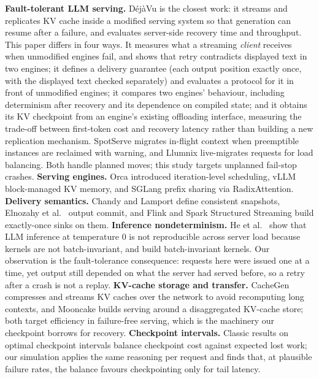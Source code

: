 \documentclass[10pt,twocolumn]{article}
\begin{document}
\textbf{Fault-tolerant LLM serving.} D\'ej\`aVu \cite{strati2024dejavu}
is the closest work: it streams and replicates KV cache inside a modified
serving system so that generation can resume after a failure, and evaluates
server-side recovery time and throughput. This paper differs in four ways.
It measures what a streaming \emph{client} receives when unmodified engines
fail, and shows that retry contradicts displayed text in two engines; it
defines a delivery guarantee (each output position exactly once, with the
displayed text checked separately) and evaluates a protocol for it in front
of unmodified engines; it compares two engines' behaviour, including
determinism after recovery and its dependence on compiled state; and it
obtains its KV checkpoint from an engine's existing offloading interface,
measuring the trade-off between first-token cost and recovery latency
rather than building a new replication mechanism. SpotServe \cite{miao2024spotserve} migrates in-flight context when
preemptible instances are reclaimed with warning, and Llumnix
\cite{sun2024llumnix} live-migrates requests for load balancing. Both handle
planned moves; this study targets unplanned fail-stop crashes.
\textbf{Serving engines.} Orca \cite{yu2022orca} introduced iteration-level
scheduling, vLLM \cite{kwon2023pagedattention} block-managed KV memory, and
SGLang \cite{zheng2024sglang} prefix sharing via RadixAttention.
\textbf{Delivery semantics.} Chandy and Lamport \cite{chandy1985snapshots}
define consistent snapshots, Elnozahy et al.\ \cite{elnozahy2002survey}
output commit, and Flink \cite{carbone2015lightweight} and Spark Structured
Streaming \cite{armbrust2018structured} build exactly-once sinks on them.
\textbf{Inference nondeterminism.} He et al.\ \cite{he2025nondeterminism}
show that LLM inference at temperature 0 is not reproducible across server
load because kernels are not batch-invariant, and build batch-invariant
kernels. Our observation is the fault-tolerance consequence: requests here
were issued one at a time, yet output still depended on what the server had
served before, so a retry after a crash is not a replay.
\textbf{KV-cache storage and transfer.} CacheGen \cite{liu2024cachegen}
compresses and streams KV caches over the network to avoid recomputing long
contexts, and Mooncake \cite{qin2025mooncake} builds serving around a
disaggregated KV-cache store; both target efficiency in failure-free
serving, which is the machinery our checkpoint borrows for recovery.
\textbf{Checkpoint intervals.} Classic results on optimal checkpoint
intervals \cite{young1974first,daly2006higher} balance checkpoint cost
against expected lost work; our simulation applies the same reasoning per
request and finds that, at plausible failure rates, the balance favours
checkpointing only for tail latency.
\end{document}
